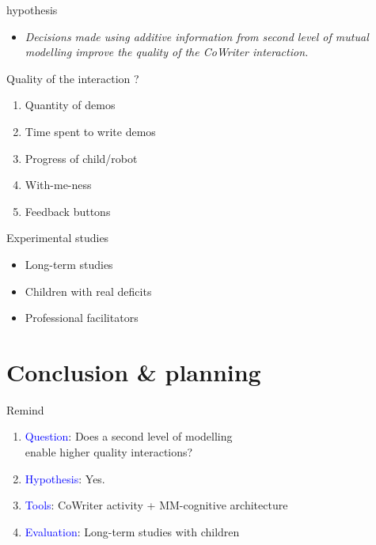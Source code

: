 \documentclass[compress]{beamer}
\begin{document}
\begin{frame}{hypothesis}
\begin{itemize}
	\item \textit{Decisions made using additive information from second level of mutual modelling improve the quality of the CoWriter interaction.}
\end{itemize}
\end{frame}

\begin{frame}{Quality of the interaction ?}
\begin{enumerate}
	\item Quantity of demos
	\item Time spent to write demos
	\item Progress of child/robot
	\item With-me-ness
	\item Feedback buttons 
\end{enumerate}
\end{frame}

\begin{frame}{Experimental studies}
\begin{itemize}
	\item Long-term studies
	\item Children with real deficits
	\item Professional facilitators
\end{itemize}
\end{frame}

\section{Conclusion \& planning}

\begin{frame}{Remind}
\begin{enumerate}
\item \textcolor{blue}{Question}: Does a second level of modelling\\enable higher quality interactions?
\item \textcolor{blue}{Hypothesis}: Yes.
\item \textcolor{blue}{Tools}: CoWriter activity + MM-cognitive architecture
\item \textcolor{blue}{Evaluation}: Long-term studies with children
\end{enumerate}
\end{frame}
\end{document}
